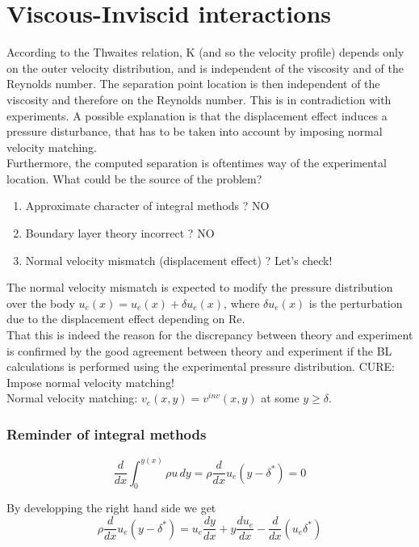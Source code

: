 \section{Viscous-Inviscid interactions}

According to the Thwaites relation, K (and so the velocity profile) depends only on the outer velocity distribution, and is independent of the viscosity and of the Reynolds number. The separation point location is then independent of the viscosity and therefore on the Reynolds number. This is in contradiction with experiments. A possible explanation is that the displacement effect induces a pressure disturbance, that has to be taken into account by imposing normal velocity matching.\\

Furthermore, the computed separation is oftentimes way of the experimental location. What could be the source of the problem?
\begin{enumerate}
\item Approximate character of integral methods ? NO
\item Boundary layer theory incorrect ? NO
\item Normal velocity mismatch (displacement effect) ? Let's check!
\end{enumerate}

The normal velocity mismatch is expected to modify the pressure distribution over the body $u_e(x)=u_e(x)+\delta u_e(x)$, where $\delta u_e(x)$ is the perturbation due to the displacement effect depending on Re.\\

That this is indeed the reason for the discrepancy between theory and experiment is confirmed by the good agreement between theory and experiment if the BL calculations is performed using the experimental pressure distribution. CURE: Impose normal velocity matching!
\\

Normal velocity matching: $ v_e(x,y)=v^{inv}(x,y)$ at some $y \ge \delta$. 

\subsubsection{Reminder of integral methods}
\begin{equation}
\frac{d}{d x} \int_0^{y(x)} \rho u \, dy =\rho \frac{d}{d x} u_e (y-\delta^*)=0
\end{equation}

By developping the right hand side we get
\begin{equation}
\rho \frac{d}{d x} u_e (y-\delta^*)=u_e \frac{d y}{d x} +y  \frac{d u_e}{d x} - \frac{d}{d x} (u_e\delta^*)
\end{equation}

